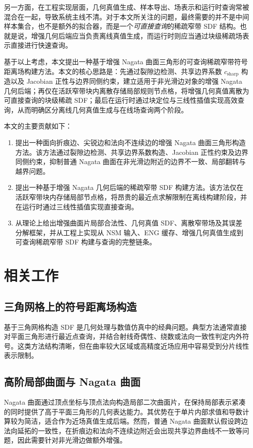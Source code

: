\documentclass[11pt,a4paper]{ctexart}
\begin{document}
另一方面，在工程实现层面，几何真值生成、样本导出、场表示和运行时查询常被混合在一起，导致系统主线不清。对于本文所关注的问题，最终需要的并不是中间样本集合，也不是额外的拟合器，而是一个\emph{可直接查询}的稀疏窄带 SDF 结构。也就是说，增强几何后端应当负责离线真值生成，而运行时则应当通过块级稀疏场表示直接进行快速查询。

基于以上考虑，本文提出一种基于增强 Nagata 曲面三角形的可查询稀疏窄带符号距离场构建方法。本文的核心思路是：先通过裂隙边检测、共享边界系数 $c_{\mathrm{sharp}}$ 构造以及 Jacobian 正性与边界同侧约束，建立适用于非光滑边对象的增强 Nagata 几何后端；再仅在活跃窄带块内离散存储局部规则节点格，将增强几何真值离散为可直接查询的块级稀疏 SDF；最后在运行时通过块定位与三线性插值实现高效查询，从而明确区分离线几何真值生成与在线场查询两个阶段。

本文的主要贡献如下：
\begin{enumerate}[leftmargin=2em]
    \item 提出一种面向折痕边、尖锐边和法向不连续边的增强 Nagata 曲面三角形构造方法。该方法通过裂隙边检测、共享边界系数构造、Jacobian 正性约束及边界同侧约束，抑制普通 Nagata 曲面在非光滑边附近的边界不一致、局部翻转与越界问题。
    \item 提出一种基于增强 Nagata 几何后端的稀疏窄带 SDF 构建方法。该方法仅在活跃窄带块内存储局部节点格，将昂贵的最近点求解限制在离线构建阶段，并在运行时通过三线性插值实现直接查询。
    \item 从理论上给出增强曲面片局部合法性、几何真值 SDF、离散窄带场及其误差分解框架，并从工程上实现从 NSM 输入、ENG 缓存、增强几何真值生成到可查询稀疏窄带 SDF 构建与查询的完整链条。
\end{enumerate}

\section{相关工作}

\subsection{三角网格上的符号距离场构造}
基于三角网格构造 SDF 是几何处理与数值仿真中的经典问题。典型方法通常直接对平面三角形进行最近点查询，并结合射线奇偶性、绕数或法向一致性判定内外符号。这类方法结构清晰，但在曲率较大区域或高精度近场应用中容易受到分片线性表示限制。

\subsection{高阶局部曲面与 Nagata 曲面}
Nagata 曲面通过顶点坐标与顶点法向构造局部二次曲面片，在保持局部表示紧凑的同时提供了高于平面三角形的几何表达能力。其优势在于单片内部求值和导数计算较为简洁，适合作为近场真值生成后端。然而，普通 Nagata 曲面默认假设跨边法向延拓的一致性，在折痕边和法向不连续边附近会出现共享边界曲线不一致等问题，因此需要针对非光滑边做额外增强。
\end{document}

